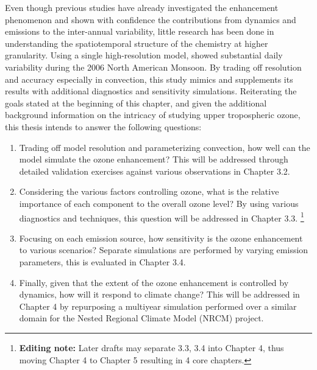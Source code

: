 Even though previous studies have already investigated the enhancement phenomenon and shown
with confidence the contributions from dynamics and emissions to the inter-annual variability, little
research has been done in understanding the spatiotemporal structure of the chemistry at higher granularity.
Using a single high-resolution model, \citet{Barth:2012qf} showed substantial daily variability during the
2006 North American Monsoon. By trading off resolution and accuracy especially in convection, this
study mimics \citet{Barth:2012qf} and supplements its results with additional diagnostics and sensitivity
simulations. Reiterating the goals stated at the beginning of this chapter, and given the additional
background information on the intricacy of studying upper tropospheric ozone, this thesis intends to
answer the following questions:
\begin{enumerate}
\item{} Trading off model resolution and parameterizing convection, how well can the model simulate the
ozone enhancement? This will be addressed through detailed validation exercises against various
observations in Chapter 3.2.
\item{} Considering the various factors controlling ozone, what is the relative importance of each component
to the overall ozone level? By using various diagnostics and techniques, this question will be addressed
in Chapter 3.3. \footnote{{\bf Editing note:} Later drafts may separate 3.3, 3.4 into Chapter 4, thus moving
Chapter 4 to Chapter 5 resulting in 4 core chapters.}
\item{} Focusing on each emission source, how sensitivity is the ozone enhancement to various scenarios?
Separate simulations are performed by varying emission parameters, this is evaluated in Chapter 3.4.
\item{} Finally, given that the extent of the ozone enhancement is controlled by dynamics, how will it respond
to climate change? This will be addressed in Chapter 4 by repurposing a multiyear simulation performed over
a similar domain for the Nested Regional Climate Model (NRCM) project.
\end{enumerate}

